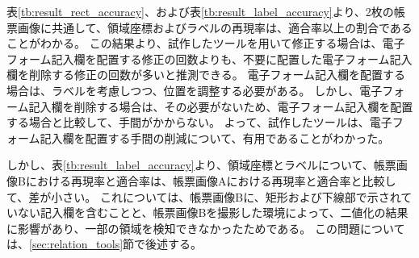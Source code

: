 表\ref{tb:result_rect_accuracy}、および表\ref{tb:result_label_accuracy}より、2枚の帳票画像に共通して、領域座標およびラベルの再現率は、適合率以上の割合であることがわかる。
この結果より、試作したツールを用いて修正する場合は、電子フォーム記入欄を配置する修正の回数よりも、不要に配置した電子フォーム記入欄を削除する修正の回数が多いと推測できる。
電子フォーム記入欄を配置する場合は、ラベルを考慮しつつ、位置を調整する必要がある。
しかし、電子フォーム記入欄を削除する場合は、その必要がないため、電子フォーム記入欄を配置する場合と比較して、手間がかからない。
よって、試作したツールは、電子フォーム記入欄を配置する手間の削減について、有用であることがわかった。

しかし、表\ref{tb:result_label_accuracy}より、領域座標とラベルについて、帳票画像Bにおける再現率と適合率は、帳票画像Aにおける再現率と適合率と比較して、差が小さい。
これについては、帳票画像Bに、矩形および下線部で示されていない記入欄を含むことと、帳票画像Bを撮影した環境によって、二値化の結果に影響があり、一部の領域を検知できなかったためである。
この問題については、\ref{sec:relation_tools}節で後述する。








